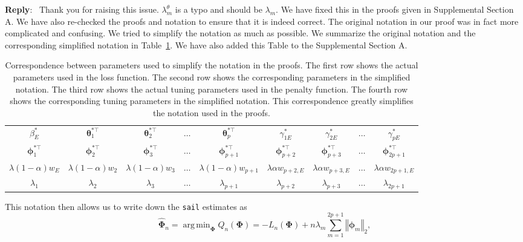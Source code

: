 \documentclass[11pt]{article}
\newcommand{\btheta}{\boldsymbol{\theta}}
\DeclareMathOperator*{\argmin}{arg\,min}
\newenvironment{reply}
   {\medskip \noindent \begin{sf}\textbf{Reply}:\  }
   {\medskip \end{sf}}
\begin{document}
\begin{reply}
Thank you for raising this issue. $\lambda_m^\theta$ is a typo and should be $\lambda_m$. We have fixed this in the proofs given in Supplemental Section A. We have also re-checked the proofs and notation to ensure that it is indeed correct. The original notation in our proof was in fact more complicated and confusing. We tried to simplify the notation as much as possible. We summarize the original notation and the corresponding simplified notation in Table~\ref{tab:proofs}. We have also added this Table to the Supplemental Section A. 
	\begin{table}[H]
	    \centering
	    \begin{tabular}{|c|c|c|c|c|c|c|c|c|}
	    \hline
	       $\beta_{E}^{*}$ & $\btheta_{1}^{*\top}$ & $\btheta_{2}^{*\top}$ & $\ldots$ & $\btheta_{p}^{*\top}$ & $\gamma_{1E}^{*}$ & $\gamma_{2E}^{*}$ & $\ldots$ & $\gamma_{pE}^{*}$ \\
	       \rule{0pt}{4ex}    
	       $\boldsymbol{\phi}_{1}^{*\top}$ & $\boldsymbol{\phi}_{2}^{*\top}$ & $\boldsymbol{\phi}_{3}^{*\top}$ & $\ldots$ & $\boldsymbol{\phi}_{p+1}^{*\top}$ & $\boldsymbol{\phi}_{p+2}^{*\top}$ &
	       $\boldsymbol{\phi}_{p+3}^{*\top}$ & $\ldots$ & $\boldsymbol{\phi}_{2p+1}^{*\top}$ \\
	       \midrule
	       	       \rule{0pt}{4ex}    
$\lambda(1-\alpha)w_{E}$ & $\lambda(1-\alpha)w_{2}$ & $\lambda(1-\alpha)w_{3}$ & $\ldots$ &  $\lambda(1-\alpha)w_{p+1}$ & $\lambda\alpha w_{p+2,E}$ & $\lambda\alpha w_{p+3,E}$ & $\ldots$ &  $\lambda\alpha w_{2p+1,E}$\\
	       	       \rule{0pt}{4ex}    
$\lambda_1$ & $\lambda_2$ & $\lambda_3$ & $\ldots$ & $\lambda_{p+1}$ & $\lambda_{p+2}$ & $\lambda_{p+3}$ & $\ldots$ & $\lambda_{2p+1}$ \\
	       \hline
	    \end{tabular}
	    \caption{Correspondence between parameters used to simplify the notation in the proofs. The first row shows the actual parameters used in the loss function. The second row shows the corresponding parameters in the simplified notation. The third row shows the actual tuning parameters used in the penalty function. The fourth row shows the corresponding tuning parameters in the simplified notation. This correspondence greatly simplifies the notation used in the proofs. }
	    \label{tab:proofs}
	\end{table}


This notation then allows us to write down the \texttt{sail} estimates as
	\begin{equation}
	\widehat{\boldsymbol{\Phi}}_{n}=\argmin_{\boldsymbol{\Phi}}Q_{n}(\boldsymbol{\Phi})=-L_{n}(\boldsymbol{\Phi})+n\lambda_{m}\sum_{m=1}^{2p+1}\left\Vert \boldsymbol{\phi}_{m}\right\Vert _{2},
	\end{equation}

\end{reply}

\FloatBarrier



\end{document}
